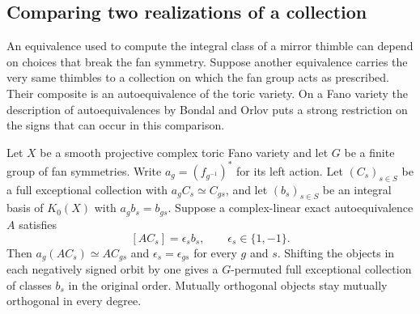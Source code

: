 \subsection{Comparing two realizations of a collection}\label{sec:ordinarymarking}

An equivalence used to compute the integral class of a mirror thimble can depend on choices that break the fan symmetry. Suppose another equivalence carries the very same thimbles to a collection on which the fan group acts as prescribed. Their composite is an autoequivalence of the toric variety. On a Fano variety the description of autoequivalences by Bondal and Orlov puts a strong restriction on the signs that can occur in this comparison.

\begin{proposition}\label{prop:ordinarymarking}
Let $X$ be a smooth projective complex toric Fano variety and let $G$ be a finite group of fan symmetries. Write $a_g=(f_{g^{-1}})^*$ for its left action. Let $(C_s)_{s\in S}$ be a full exceptional collection with $a_g C_s\simeq C_{gs}$, and let $(b_s)_{s\in S}$ be an integral basis of $K_0(X)$ with $a_g b_s=b_{gs}$. Suppose a complex-linear exact autoequivalence $A$ satisfies
\[
                       [A C_s]=\epsilon_s b_s,\qquad \epsilon_s\in\{1,-1\}.
\]
Then $a_g(A C_s)\simeq A C_{gs}$ and $\epsilon_s=\epsilon_{gs}$ for every $g$ and $s$. Shifting the objects in each negatively signed orbit by one gives a $G$-permuted full exceptional collection of classes $b_s$ in the original order. Mutually orthogonal objects stay mutually orthogonal in every degree.
\end{proposition}

